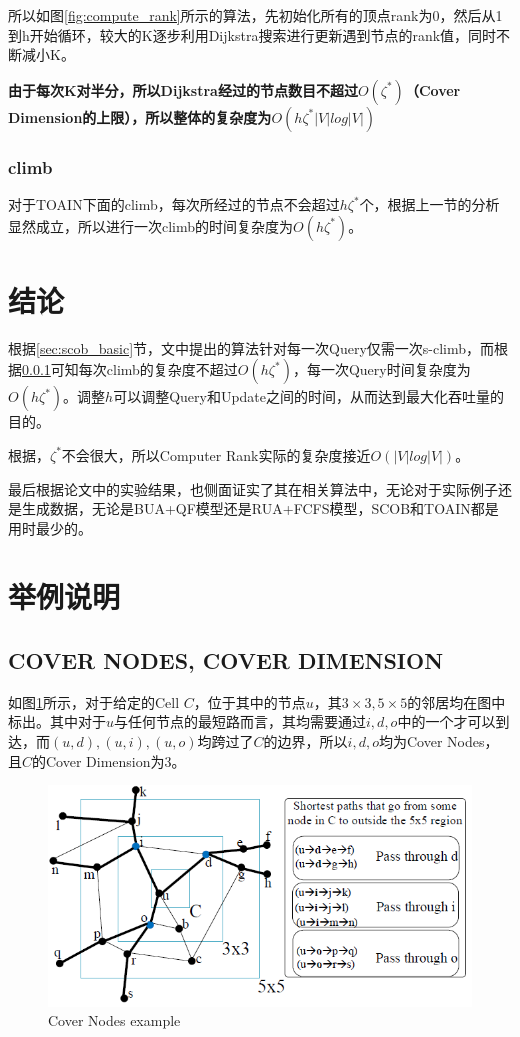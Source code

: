 \documentclass{ML}
\begin{document}
所以如图\ref{fig:compute_rank}所示的算法，先初始化所有的顶点rank为0，然后从1到h开始循环，较大的K逐步利用Dijkstra搜索进行更新遇到节点的rank值，同时不断减小K。

\textbf{由于每次K对半分，所以Dijkstra经过的节点数目不超过$O(\zeta^*)$（Cover Dimension的上限），所以整体的复杂度为$O(h\zeta^*|V|log|V|)$}

\subsubsection{climb}\label{sec:climb}
对于TOAIN下面的climb，每次所经过的节点不会超过$h\zeta^*$个，根据上一节的分析显然成立，所以进行一次climb的时间复杂度为$O(h\zeta^*)$。

\section{结论}
根据\ref{sec:scob_basic}节，文中提出的算法针对每一次Query仅需一次s-climb，而根据\ref{sec:climb}可知每次climb的复杂度不超过$O(h\zeta^*)$，每一次Query时间复杂度为$O(h\zeta^*)$。调整$h$可以调整Query和Update之间的时间，从而达到最大化吞吐量的目的。

根据\cite{zeta-most}，$\zeta^*$不会很大，所以Computer Rank实际的复杂度接近$O(|V|log|V|)$。

最后根据论文中的实验结果，也侧面证实了其在相关算法中，无论对于实际例子还是生成数据，无论是BUA+QF模型还是RUA+FCFS模型，SCOB和TOAIN都是用时最少的。
\section{举例说明}
\subsection{COVER NODES, COVER DIMENSION}\label{sec:example_cover_nodes}
如图\ref{fig:cover_nodes}所示，对于给定的Cell $C$，位于其中的节点$u$，其$3\times3, 5 \times 5$的邻居均在图中标出。其中对于$u$与任何节点的最短路而言，其均需要通过$i, d, o$中的一个才可以到达，而$(u, d), (u, i), (u, o)$均跨过了$C$的边界，所以$i, d, o$均为Cover Nodes，且$C$的Cover Dimension为3。

\begin{figure}[htb]
	\centering
	\includegraphics[width=0.7\linewidth]{media/cover_nodes.png}
	\caption{Cover Nodes example}\label{fig:cover_nodes}
\end{figure}
\end{document}
